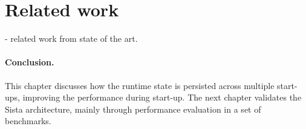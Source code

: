 \documentclass[a4paper,12pt,twoside]{../includes/ThesisStyle}
\begin{document}
\section{Related work}
\label{sec:relWork}

- related work
from state of the art.

\paragraph{Conclusion.} This chapter discusses how the runtime state is persisted across multiple start-ups, improving the performance during start-up. The next chapter validates the Sista architecture, mainly through performance evaluation in a set of benchmarks.

\ifx\wholebook\relax\else
    
\end{document}
